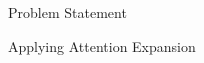 \documentclass[10pt]{beamer}
\newcommand{\tabimg}[2]{\begin{tabular}{c}\texttt{[image: \#1]}\end{tabular}}
\begin{document}
\begin{frame}{Problem Statement}
\begin{itemize}
%
%
%
%
%

%
%
%

\begin{frame}{Applying Attention Expansion}



\end{frame}
\end{itemize}
\end{frame}
\end{document}

